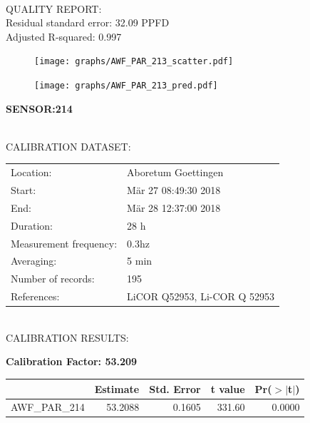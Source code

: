 \documentclass[oneside]{report}
\begin{document}
\hrulefill\\
QUALITY REPORT:\\
Residual standard error: 32.09 PPFD\\
Adjusted R-squared: 0.997



\begin{figure}[H]
  \centering
  \texttt{[image: graphs/AWF\_PAR\_213\_scatter.pdf]}
\end{figure}




\begin{figure}[H]
  \centering
  \texttt{[image: graphs/AWF\_PAR\_213\_pred.pdf]}
\end{figure}

\pagebreak


\begin{center}
\large{\textbf{SENSOR:214}}\\
\end{center}

\hrulefill\\
CALIBRATION DATASET:\\
\begin{table}[h!]
  \centering
  \label{tab:table1}
  \begin{tabular}{ll}
    Location: & Aboretum Goettingen\\ 
    
    
    Start:  & Mär 27 08:49:30 2018 \\
    End:   & Mär 28 12:37:00 2018\\ 
    Duration: & 28 h\\
    Measurement frequency: & 0.3hz\\
    Averaging:  &5 min\\
    Number of records: & 195 \\
    References: & LiCOR Q52953, Li-COR Q 52953 \\
  \end{tabular}
\end{table}

\hrulefill\\
CALIBRATION RESULTS:\\


\begin{center}
\textbf{\large{Calibration Factor: 53.209}}\\
\end{center}
\begin{table}[ht]
\centering
\begin{tabular}{rrrrr}
  \hline
 & Estimate & Std. Error & t value & Pr($>$$|$t$|$) \\ 
  \hline
AWF\_PAR\_214 & 53.2088 & 0.1605 & 331.60 & 0.0000 \\ 
   \hline
\end{tabular}
\end{table}
\end{document}
